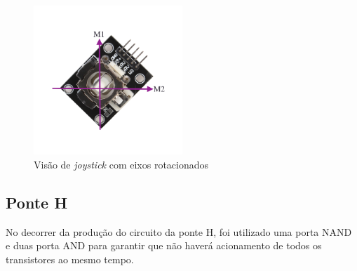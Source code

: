     \begin{figure}[!ht]
      \center
      \includegraphics[width=0.5\textwidth]{figuras/resultados/joy_m1m2}
      \caption{Visão de \textit{joystick} com eixos rotacionados}
      \label{fig:joy_m1m2}
    \end{figure}

\subsection{Ponte H}

No decorrer da produção do circuito da ponte H, foi utilizado uma porta NAND e duas porta AND para garantir que não haverá acionamento de todos os transistores ao mesmo tempo.

